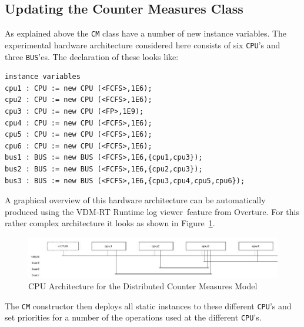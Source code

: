 \documentclass{overturerepchap}
\newcommand{\showtrace}{VDM-RT Runtime log viewer}
\begin{document}
\subsection{Updating the Counter Measures Class}

As explained above the \texttt{CM} class have a number of new instance 
variables. The experimental hardware architecture considered here consists
of six \texttt{CPU}'s and three \texttt{BUS}'es. The declaration of these looks
like: 

\begin{lstlisting}
instance variables
cpu1 : CPU := new CPU (<FCFS>,1E6);
cpu2 : CPU := new CPU (<FCFS>,1E6);
cpu3 : CPU := new CPU (<FP>,1E9);
cpu4 : CPU := new CPU (<FCFS>,1E6);
cpu5 : CPU := new CPU (<FCFS>,1E6);
cpu6 : CPU := new CPU (<FCFS>,1E6);
bus1 : BUS := new BUS (<FCFS>,1E6,{cpu1,cpu3});
bus2 : BUS := new BUS (<FCFS>,1E6,{cpu2,cpu3});
bus3 : BUS := new BUS (<FCFS>,1E6,{cpu3,cpu4,cpu5,cpu6});
\end{lstlisting}

A graphical overview of this hardware architecture can be automatically
produced using the \showtrace\ feature from Overture. For this rather complex
architecture it looks as shown in Figure~\ref{fig:cpuarchitecture}.

\begin{figure}
\begin{center}
\includegraphics[width=\textwidth]{figures/cpuarchitecture.png}
\end{center}
\caption{CPU Architecture for the Distributed Counter Measures Model
\label{fig:cpuarchitecture}}
\end{figure}

The \texttt{CM} constructor then deploys all static instances to these
different \texttt{CPU}'s and set priorities for a number of the operations
used at the different \texttt{CPU}'s.
\end{document}
